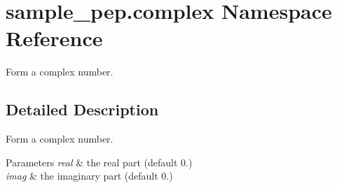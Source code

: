 \hypertarget{namespacesample__pep_1_1complex}{\section{sample\-\_\-pep.\-complex Namespace Reference}
\label{namespacesample__pep_1_1complex}
}


Form a complex number.  




\subsection{Detailed Description}
Form a complex number. 
\begin{DoxyParams}{Parameters}
{\em real} & the real part (default 0.) \\
\hline
{\em imag} & the imaginary part (default 0.) \\
\hline
\end{DoxyParams}
